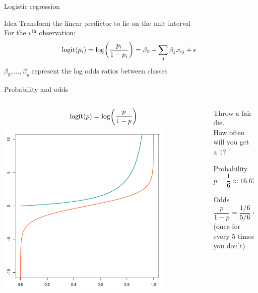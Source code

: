 \begin{frame}{Logistic regression}
    \begin{block}{Idea}
        Transform the linear predictor to lie on the unit interval \\[\bigskipamount]
        {\small%
         For the $i^{\,\text{th}}$ observation:}
        \[
            \operatorname{logit}\!\left( p_{i} \right)
            = \log\!\left( \frac{p_{i}}{1 - p_{i}} \right)
            = \beta_{0} + \sum_{j} \beta_{j} x_{ij} + \epsilon
        \]
        $\beta_{0}, \ldots, \beta_{p}$ represent the
        \alert{log odds ratios} between classes
    \end{block}
\end{frame}

\begin{frame}{Probability and odds}
    \begin{columns}[c]
        \begin{column}{0.5\textwidth}
            \centering
            \[
                \operatorname{logit}\!\left( p \right) = \log\!\left( \frac{p}{1 - p} \right)
            \]
            \includegraphics[width=0.8\textwidth]{figures/logit}
        \end{column}
        \begin{column}{0.5\textwidth}
            Throw a fair die. \\
            How often will you get a $1$?
            \begin{block}{Probability}
                \[
                    p = \frac{1}{6} \approx 16.67\% \text{ of the time}
                \]
            \end{block}
            \vspace{-0.5em}
            \begin{block}{Odds}
                \[
                    \frac{p}{1 - p} = \frac{1/6}{5/6} = \frac{1}{5} = 0.2
                \]
                {\footnotesize%
                 (once for every $5$ times you don't)}
            \end{block}
        \end{column}
    \end{columns}
\end{frame}

